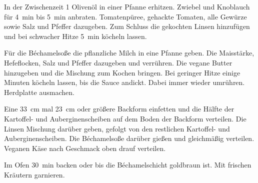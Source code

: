 \begin{recipeDP}
{        \step In der Zwischenzeit \SI{1}{\EL} Olivenöl in einer Pfanne erhitzen. Zwiebel und Knoblauch für \ca \SI{4}{\minute} bis \SI{5}{\minute} anbraten. Tomatenpüree, gehackte Tomaten, alle Gewürze sowie Salz und Pfeffer dazugeben. Zum Schluss die gekochten Linsen hinzufügen und bei schwacher Hitze \ca \SI{5}{\minute} köcheln lassen.

        \step Für die Béchamelsoße die pflanzliche Milch in eine Pfanne geben. Die Maisstärke, Hefeflocken, Salz und Pfeffer dazugeben und verrühren. Die vegane Butter hinzugeben und die Mischung zum Kochen bringen. Bei geringer Hitze einige Minuten köcheln lassen, bis die Sauce andickt. Dabei immer wieder umrühren. Herdplatte ausmachen.

        \step Eine \SI{33}{\cm} mal \SI{23}{\cm} oder größere Backform einfetten und die Hälfte der Kartoffel- und Auberginenscheiben auf dem Boden der Backform verteilen. Die Linsen Mischung darüber geben, gefolgt von den restlichen Kartoffel- und Auberginenscheiben. Die Béchamelsoße darüber gießen und gleichmäßig verteilen. Veganen Käse nach Geschmack oben drauf verteilen.

        \step Im Ofen \ca \SI{30}{\minute} backen oder bis die Béchamelschicht goldbraun ist. Mit frischen Kräutern garnieren.
    }



\end{recipeDP}
\endgroup
